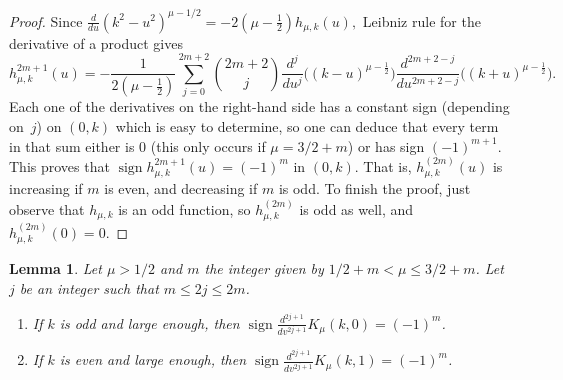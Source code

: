 \documentclass[10pt,a4paper]{article}
\numberwithin{equation}{section}
\theoremstyle{plain}
\newtheorem{Lem}[Theo]{Lemma}
\theoremstyle{definition}
\newcommand{\sign}{\operatorname{sign}}
\begin{document}
\begin{proof}
Since
$
   \frac{d}{du} (k^2-u^2)^{\mu-1/2} = -2 (\mu-\frac{1}{2}) h_{\mu,k}(u),
$
Leibniz rule for the derivative of a product gives
\[
   h_{\mu,k}^{2m+1}(u) = -\frac{1}{2(\mu-\frac{1}{2})} \sum_{j=0}^{2m+2}
   \binom{2m+2}{j}
   \frac{d^j}{du^j} \big( (k-u)^{\mu-\frac{1}{2}} \big)
   \frac{d^{2m+2-j}}{du^{2m+2-j}} \big( (k+u)^{\mu-\frac{1}{2}} \big).
\]
Each one of the derivatives on the right-hand side has a constant sign (depending on~$j$) on $(0,k)$ which is easy to determine, so one can deduce that every term in that sum either is $0$ (this only occurs if $\mu = 3/2 + m$) or has sign $(-1)^{m+1}$. This proves that
$
   \sign h_{\mu,k}^{2m+1}(u) = (-1)^m
$
in $(0,k)$. That is, $h_{\mu,k}^{(2m)}(u)$ is increasing if $m$ is even, and decreasing if $m$ is odd. To finish the proof, just observe that $h_{\mu,k}$ is an odd function, so $h_{\mu,k}^{(2m)}$ is odd as well, and $h_{\mu,k}^{(2m)}(0) = 0$.
\end{proof}

\begin{Lem}
\label{lem:claim2}
Let $\mu > 1/2$ and $m$ the integer given by $1/2 + m < \mu \leq 3/2 + m$. Let $j$ be an integer such that $m \leq 2j \leq 2m$.
\begin{enumerate}
\item[(a)] If $k$ is odd and large enough, then $\sign \frac{d^{2j+1}}{dv^{2j+1}}K_\mu(k,0) = (-1)^m$.
\item[(b)] If $k$ is even and large enough, then $\sign \frac{d^{2j+1}}{dv^{2j+1}}K_\mu(k,1) = (-1)^m$.
\end{enumerate}
\end{Lem}
\end{document}
